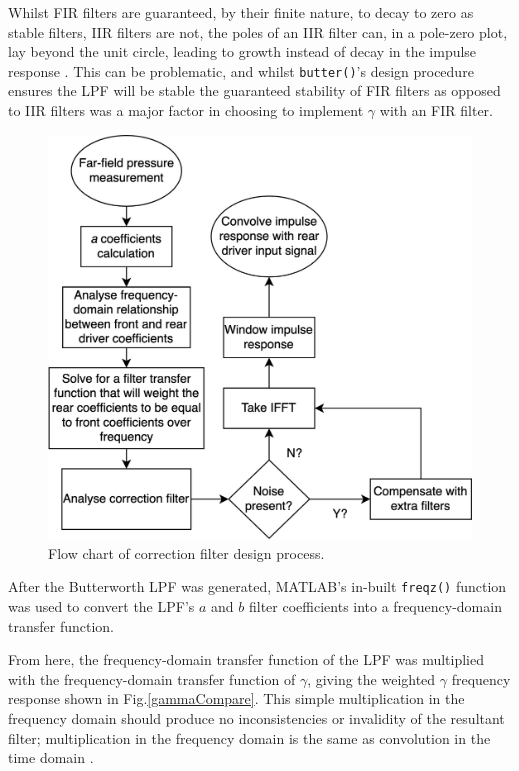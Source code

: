 \documentclass{report}
\begin{document}
            Whilst FIR filters are guaranteed, by their finite nature, to decay to zero as stable filters, IIR filters are not, the poles of an IIR filter can, in a pole-zero plot, lay beyond the unit circle, leading to growth instead of decay in the impulse response \cite{litwin2000fir}.
            This can be problematic, and whilst \texttt{butter()}'s design procedure ensures the LPF will be stable the guaranteed stability of FIR filters as opposed to IIR filters was a major factor in choosing to implement $\gamma$ with an FIR filter. 

            \begin{figure}
                \centering
                \includegraphics[width = 0.9\linewidth]{figs/filterFlow.png}
                \caption{Flow chart of correction filter design process.}
                \label{filterFlow}
            \end{figure}

            After the Butterworth LPF was generated, MATLAB's in-built \texttt{freqz()} function was used to convert the LPF's $a$ and $b$ filter coefficients into a frequency-domain transfer function.

            From here, the frequency-domain transfer function of the LPF was multiplied with the frequency-domain transfer function of $\gamma$, giving the weighted $\gamma$ frequency response shown in Fig.\ref{gammaCompare}.
            This simple multiplication in the frequency domain should produce no inconsistencies or invalidity of the resultant filter; multiplication in the frequency domain is the same as convolution in the time domain \cite{stanfordConvolution}.
            
\end{document}
